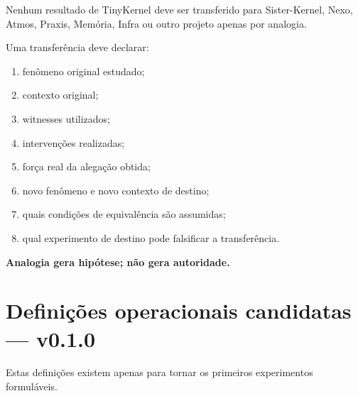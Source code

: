 \documentclass[11pt,a4paper]{article}
\begin{document}
Nenhum resultado de TinyKernel deve ser transferido para Sister-Kernel, Nexo, Atmos,
Praxis, Memória, Infra ou outro projeto apenas por analogia.

Uma transferência deve declarar:

\begin{enumerate}
  \item fenômeno original estudado;
  \item contexto original;
  \item witnesses utilizados;
  \item intervenções realizadas;
  \item força real da alegação obtida;
  \item novo fenômeno e novo contexto de destino;
  \item quais condições de equivalência são assumidas;
  \item qual experimento de destino pode falsificar a transferência.
\end{enumerate}

\begin{warningbox}
\textbf{Analogia gera hipótese; não gera autoridade.}
\end{warningbox}

\section{Definições operacionais candidatas — v0.1.0}

Estas definições existem apenas para tornar os primeiros experimentos formuláveis.
\end{document}
